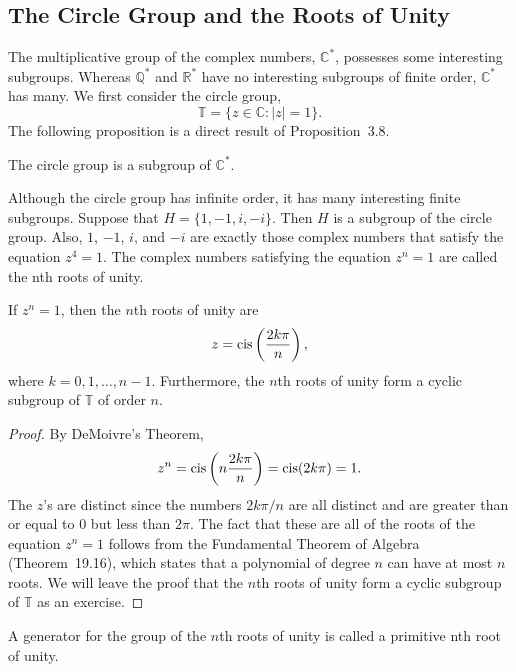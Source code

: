  
\subsection*{The Circle Group and the Roots of Unity }
 
 
The multiplicative group of the complex numbers, ${\mathbb C}^*$,
possesses some interesting subgroups.  Whereas ${\mathbb Q}^*$ and ${\mathbb
R}^*$ have no interesting subgroups of finite order, ${\mathbb C}^*$ has 
many. We first consider the {\bfi circle group}, 
$$
{\mathbb T}\label{notecirclegroup} = \{ z \in {\mathbb C} : |z| = 1 \}.
$$
The following proposition is a direct result of Proposition~3.8.
 
 
\begin{proposition}
The circle group is a subgroup of  ${\mathbb C}^*$.
\end{proposition}
 
 
Although the circle group has infinite order, it has many interesting 
finite subgroups. Suppose that $H = \{ 1, -1, i, -i \}$. Then $H$ is a
subgroup of the circle group. Also, $1$, $-1$, $i$, and $-i$ are
exactly those complex numbers that satisfy the equation $z^4=1$. 
The complex numbers satisfying the equation $z^n=1$ are called
the {\bfi nth roots of unity}. 
 
 
\begin{theorem}
If $z^n = 1$, then the $n$th roots of unity are
$$
z = \operatorname{cis} \left( \frac{2 k \pi}{n } \right),
$$
where $k = 0, 1, \ldots, n-1$. Furthermore, the $n$th roots of unity
form a cyclic subgroup of\/ ${\mathbb T}$ of order $n$. 
\end{theorem}
 
 
\begin{proof}
By DeMoivre's Theorem,
$$
z^n = \operatorname{cis} \left( n \frac{2 k \pi}{n } \right) =
\operatorname{cis}( 2 k \pi ) = 1.
$$
The $z$'s are distinct since the numbers $2 k \pi /n$ are all
distinct and are greater than or equal to 0 but less than $2 \pi$.
The fact that these are all of the roots of the equation $z^n=1$
follows from the Fundamental Theorem of Algebra (Theorem~19.16), which
states that a polynomial of degree $n$ can have at most $n$ roots.  We
will leave the proof that the $n$th roots of unity form a cyclic
subgroup of ${\mathbb T}$ as an exercise.
\end{proof}
 
 
\vspace{2ex}
 
 
A generator for the group of the $n$th roots of unity is called a
{\bfi primitive nth root of unity}. 
 
